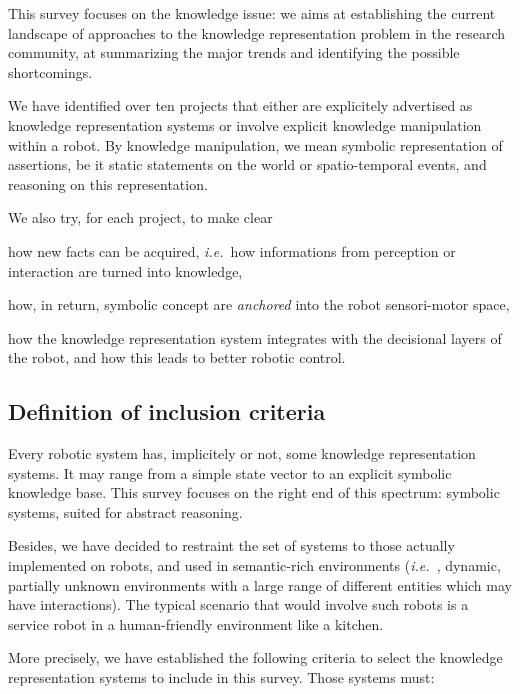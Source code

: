 \documentclass[a4paper, twocolumn]{article}
\newcommand{\ie}{{\textit{i.e.~}}}
\begin{document}
This survey focuses on the knowledge issue: we aims at establishing the current
landscape of approaches to the knowledge representation problem in the research
community, at summarizing the major trends and identifying the possible
shortcomings.

We have identified over ten projects that either are explicitely advertised as
knowledge representation systems or involve explicit knowledge manipulation
within a robot. By knowledge manipulation, we mean symbolic representation of
assertions, be it static statements on the world or spatio-temporal events, and
reasoning on this representation.

We also try, for each project, to make clear \begin{inparaenum} \item how new
facts can be acquired, \ie how informations from perception or interaction are
turned into knowledge, \item how, in return, symbolic concept are
\emph{anchored} into the robot sensori-motor space, \item how the knowledge
representation system integrates with the decisional layers of the robot, and
how this leads to better robotic control.\end{inparaenum}


\subsection{Definition of inclusion criteria}
\label{sect|inclusion-criteria}

Every robotic system has, implicitely or not, some knowledge representation
systems. It may range from a simple state vector to an explicit symbolic
knowledge base.  This survey focuses on the right end of this spectrum:
symbolic systems, suited for abstract reasoning.

Besides, we have decided to restraint the set of systems to those actually
implemented on robots, and used in semantic-rich environments (\ie , dynamic,
partially unknown environments with a large range of different entities which
may have interactions). The typical scenario that would involve such robots is
a service robot in a human-friendly environment like a kitchen.

More precisely, we have established the following criteria to select the
knowledge representation systems to include in this survey. Those systems must:
\end{document}

